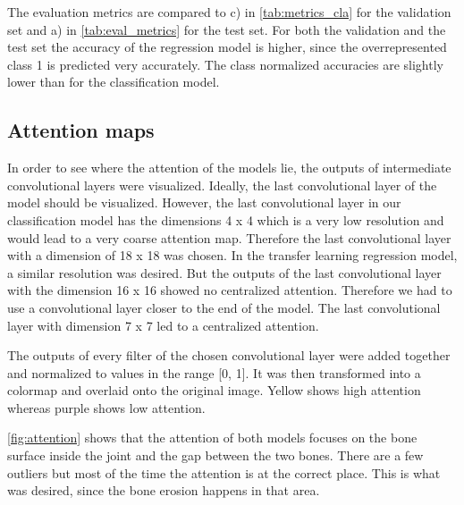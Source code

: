 \documentclass[12pt]{article}
\begin{document}
The evaluation metrics are compared to c) in \autoref{tab:metrics_cla} for the validation set and a) in \autoref{tab:eval_metrics} for the test set. For both the validation and the test set the accuracy of the regression model is higher, since the overrepresented class 1 is predicted very accurately. The class normalized accuracies are slightly lower than for the classification model.

\FloatBarrier

\subsection{Attention maps}
\label{subsec:attention}

In order to see where the attention of the models lie, the outputs of intermediate convolutional layers were visualized. Ideally, the last convolutional layer of the model should be visualized. However, the last convolutional layer in our classification model has the dimensions 4 x 4 which is a very low resolution and would lead to a very coarse attention map. Therefore the last convolutional layer with a dimension of 18 x 18 was chosen. In the transfer learning regression model, a similar resolution was desired. But the outputs of the last convolutional layer with the dimension 16 x 16 showed no centralized attention. Therefore we had to use a convolutional layer closer to the end of the model. The last convolutional layer with dimension 7 x 7 led to a centralized attention.

The outputs of every filter of the chosen convolutional layer were added together and normalized to values in the range [0, 1]. It was then transformed into a colormap and overlaid onto the original image. Yellow shows high attention whereas purple shows low attention.

\autoref{fig:attention} shows that the attention of both models focuses on the bone surface inside the joint and the gap between the two bones. There are a few outliers but most of the time the attention is at the correct place. This is what was desired, since the bone erosion happens in that area.
\end{document}
